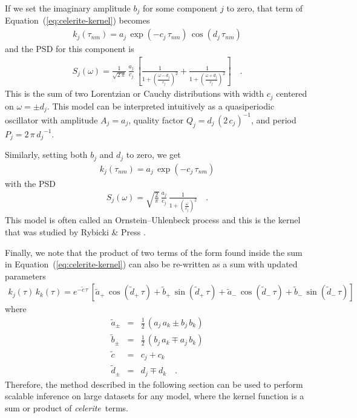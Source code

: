 \documentclass[manuscript, letterpaper]{aastex6}
\newcommand{\celeriteterm}{\emph{celerite}}
\renewcommand{\eqref}[1]{\ref{eq:#1}}
\newcommand{\Eq}[1]{Equation~(\eqref{#1})}
\newcommand{\eq}[1]{\Eq{#1}}
\newcommand{\eqlabel}[1]{\label{eq:#1}}
\newcommand{\response}[1]{{\color{blue}#1}}
\begin{document}
If we set the imaginary amplitude $b_j$ for some component $j$ to zero, that
term of \eq{celerite-kernel} becomes
\begin{eqnarray}
k_j(\tau_{nm}) =
    a_j\,\exp\left(-c_j\,\tau_{nm}\right)\,\cos\left(d_j\,\tau_{nm}\right)
\end{eqnarray}
and the PSD for this component is
\begin{eqnarray}\eqlabel{lorentz-psd}
S_j(\omega) = \frac{1}{\sqrt{2\,\pi}}\,\frac{a_j}{c_j}\,\left[
    \frac{1}{1+{\left(\frac{\omega-d_j}{c_j}\right)}^2} +
    \frac{1}{1+{\left(\frac{\omega+d_j}{c_j}\right)}^2}
\right] \quad.
\end{eqnarray}
This is the sum of two Lorentzian or Cauchy distributions with width $c_j$
centered on $\omega = \pm d_j$.
This model can be interpreted intuitively as a quasiperiodic oscillator with
amplitude $A_j = a_j$, quality factor $Q_j = d_j\,{(2\,c_j)}^{-1}$, and period
$P_j = 2\,\pi\,{d_j}^{-1}$.

Similarly, setting both $b_j$ and $d_j$ to zero, we get
\begin{eqnarray}
k_j(\tau_{nm}) = a_j\,\exp\left(-c_j\,\tau_{nm}\right)
\end{eqnarray}
with the PSD
\begin{eqnarray}
S_j(\omega) = \sqrt{\frac{2}{\pi}}\,\frac{a_j}{c_j}\,
    \frac{1}{1+{\left(\frac{\omega}{c_j}\right)}^2} \quad.
\end{eqnarray}
This model is often called an Ornstein--Uhlenbeck process \response{\citep[in
reference to the classic paper,][]{Uhlenbeck:1930}} and this is the kernel
that was studied by Rybicki \& Press \citep{Rybicki:1992,Rybicki:1995}.

Finally, we note that the product of two terms of the form found inside the
sum in \eq{celerite-kernel} can also be re-written as a sum with updated
parameters
\begin{eqnarray}\eqlabel{product-rule}
k_j(\tau) \, k_k(\tau) =
    e^{-\tilde{c}\,\tau}\,[
        \tilde{a}_+\,\cos(\tilde{d}_+\,\tau) + \tilde{b}_+\,\sin(\tilde{d}_+\,\tau) +
        \tilde{a}_-\,\cos(\tilde{d}_-\,\tau) + \tilde{b}_-\,\sin(\tilde{d}_-\,\tau)
    ]
\end{eqnarray}
where
\begin{eqnarray}
    \tilde{a}_{\pm} &=& \frac{1}{2}\,(a_j\,a_k \pm b_j\,b_k) \\
    \tilde{b}_{\pm} &=& \frac{1}{2}\,(b_j\,a_k \mp a_j\,b_k) \\
    \tilde{c} &=& c_j + c_k \\
    \tilde{d}_{\pm} &=& d_j \mp d_k \quad.
\end{eqnarray}
Therefore, the method described in the following section can be used to
perform scalable inference on large datasets for any model, where the kernel
function is a sum or product of \celeriteterm\ terms.
\end{document}
